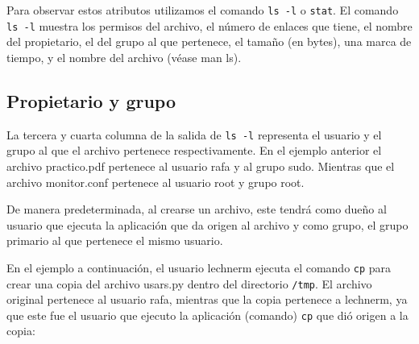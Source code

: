 \documentclass[12pt]{article}
\begin{document}
Para observar estos atributos utilizamos el comando \texttt{ls -l} o \texttt{stat}. 
El comando \texttt{ls -l} muestra los permisos del archivo,  el  número  de  enlaces  
que  tiene,  el  nombre  del  propietario,  el  del  grupo  al  que  pertenece, 
el tamaño (en bytes), una marca de tiempo, y el nombre del archivo (véase man ls).



\subsection*{Propietario y grupo}
La tercera y cuarta columna de la salida de \texttt{ls -l} representa 
el usuario y el grupo al que el archivo 
pertenece respectivamente. En el ejemplo anterior el archivo 
practico.pdf pertenece al usuario rafa y al grupo sudo. Mientras que 
el archivo monitor.conf pertenece al usuario root y grupo root. 

De manera predeterminada, al crearse un archivo, este tendrá como 
dueño al usuario que ejecuta la aplicación que da origen al archivo y 
como grupo, el grupo primario al que pertenece el mismo usuario. 

En el ejemplo a continuación, el usuario lechnerm ejecuta el comando 
\texttt{cp} para crear una copia del archivo usars.py dentro del directorio
\texttt{/tmp}. El archivo original pertenece al usuario rafa, mientras que
la copia pertenece a lechnerm, ya que este fue el usuario que ejecuto la 
aplicación (comando) \texttt{cp} que dió origen a la copia: 
\end{document}
